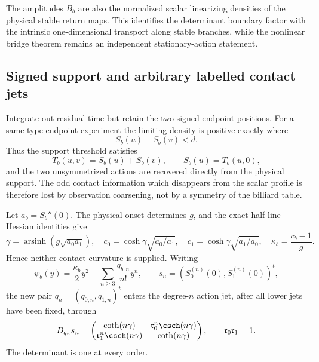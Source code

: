 The amplitudes $B_b$ are also the normalized scalar linearizing densities of
the physical stable return maps.  This identifies the determinant boundary
factor with the intrinsic one-dimensional transport along stable branches,
while the nonlinear bridge theorem remains an independent stationary-action
statement.

\subsection{Signed support and arbitrary labelled contact jets}

Integrate out residual time but retain the two signed endpoint positions.
For a same-type endpoint experiment the limiting density is positive exactly
where
\begin{equation}\label{eq:intro-v21-support}
                         S_b(u)+S_b(v)<d.
\end{equation}
Thus the support threshold satisfies
\[
 T_b(u,v)=S_b(u)+S_b(v),\qquad S_b(u)=T_b(u,0),
\]
and the two unsymmetrized actions are recovered directly from the physical
support.  The odd contact information which disappears from the scalar
profile is therefore lost by observation coarsening, not by a symmetry of the
billiard table.

Let $a_b=S_b''(0)$.  The physical onset determines $g$, and the exact
half-line Hessian identities give
\begin{equation}\label{eq:intro-v21-leading}
 \gamma=\operatorname{arsinh}(g\sqrt{a_0a_1}),
 \quad
 c_0=\cosh\gamma\sqrt{a_0/a_1},
 \quad
 c_1=\cosh\gamma\sqrt{a_1/a_0},
 \quad
 \kappa_b=\frac{c_b-1}{g}.
\end{equation}
Hence neither contact curvature is supplied.  Writing
\[
 \psi_b(y)=\frac{\kappa_b}{2}y^2+
 \sum_{n\ge3}\frac{q_{b,n}}{n!}y^n,
 \qquad
 s_n=(S_0^{(n)}(0),S_1^{(n)}(0))^t,
\]
the new pair $q_n=(q_{0,n},q_{1,n})^t$ enters the degree-$n$ action jet,
after all lower jets have been fixed, through
\begin{equation}\label{eq:intro-v21-jet-block}
 D_{q_n}s_n=
 \begin{pmatrix}
 \coth(n\gamma)&\mathfrak r_0^n\csch(n\gamma)\\
 \mathfrak r_1^n\csch(n\gamma)&\coth(n\gamma)
 \end{pmatrix},
 \qquad \mathfrak r_0\mathfrak r_1=1.
\end{equation}
The determinant is one at every order.

